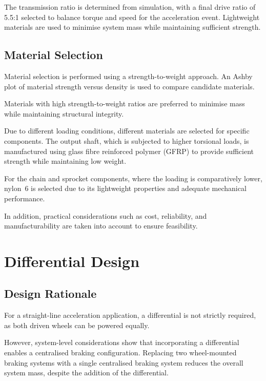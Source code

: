 The transmission ratio is determined from simulation, with a final drive ratio of 5.5:1 selected to balance torque and speed for the acceleration event. Lightweight materials are used to minimise system mass while maintaining sufficient strength.


\subsection{Material Selection}

Material selection is performed using a strength-to-weight approach. An Ashby plot of material strength versus density is used to compare candidate materials.

Materials with high strength-to-weight ratios are preferred to minimise mass while maintaining structural integrity.

Due to different loading conditions, different materials are selected for specific components. The output shaft, which is subjected to higher torsional loads, is manufactured using glass fibre reinforced polymer (GFRP) to provide sufficient strength while maintaining low weight.

For the chain and sprocket components, where the loading is comparatively lower, nylon~6 is selected due to its lightweight properties and adequate mechanical performance.

In addition, practical considerations such as cost, reliability, and manufacturability are taken into account to ensure feasibility.

\section{Differential Design}

\subsection{Design Rationale}

For a straight-line acceleration application, a differential is not strictly required, as both driven wheels can be powered equally.

However, system-level considerations show that incorporating a differential enables a centralised braking configuration. Replacing two wheel-mounted braking systems with a single centralised braking system reduces the overall system mass, despite the addition of the differential.
